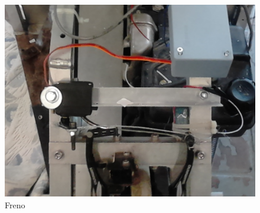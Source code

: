 \begin{figure}
\centering
\includegraphics[width=4.5in]{fotos/freno}
\caption{Freno}
\label{fig:fotos:Freno}
\end{figure}
